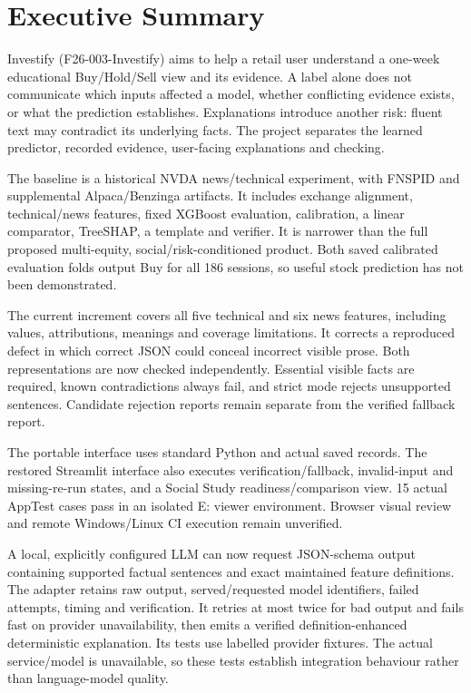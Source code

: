 \chapter*{Executive Summary}
Investify (F26-003-Investify) aims to help a retail user understand a one-week educational Buy/Hold/Sell view and its evidence. A label alone does not communicate which inputs affected a model, whether conflicting evidence exists, or what the prediction establishes. Explanations introduce another risk: fluent text may contradict its underlying facts. The project separates the learned predictor, recorded evidence, user-facing explanations and checking.

The baseline is a historical NVDA news/technical experiment, with FNSPID and supplemental Alpaca/Benzinga artifacts. It includes exchange alignment, technical/news features, fixed XGBoost evaluation, calibration, a linear comparator, TreeSHAP, a template and verifier. It is narrower than the full proposed multi-equity, social/risk-conditioned product. Both saved calibrated evaluation folds output Buy for all 186 sessions, so useful stock prediction has not been demonstrated.

The current increment covers all five technical and six news features, including values, attributions, meanings and coverage limitations. It corrects a reproduced defect in which correct JSON could conceal incorrect visible prose. Both representations are now checked independently. Essential visible facts are required, known contradictions always fail, and strict mode rejects unsupported sentences. Candidate rejection reports remain separate from the verified fallback report.

The portable interface uses standard Python and actual saved records. The restored Streamlit interface also executes verification/fallback, invalid-input and missing-re-run states, and a Social Study readiness/comparison view. 15 actual AppTest cases pass in an isolated E: viewer environment. Browser visual review and remote Windows/Linux CI execution remain unverified.

A local, explicitly configured LLM can now request JSON-schema output containing supported factual sentences and exact maintained feature definitions. The adapter retains raw output, served/requested model identifiers, failed attempts, timing and verification. It retries at most twice for bad output and fails fast on provider unavailability, then emits a verified definition-enhanced deterministic explanation. Its tests use labelled provider fixtures. The actual service/model is unavailable, so these tests establish integration behaviour rather than language-model quality.

